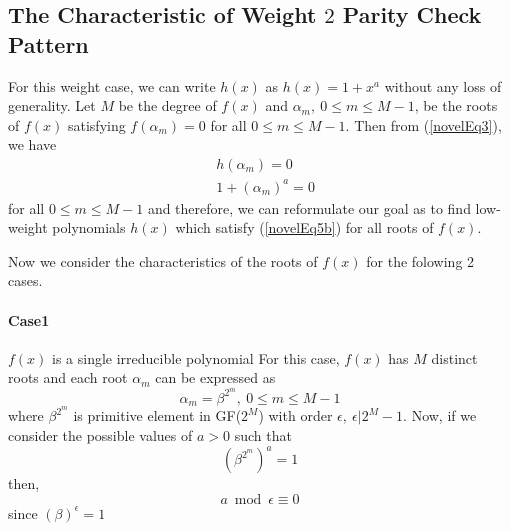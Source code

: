\subsection{The Characteristic of Weight $2$ Parity Check Pattern}
For this weight case, we can write $h(x)$ as $h(x)=1+x^a$ without any loss of generality. 
Let $M$ be the degree of $f(x)$ and $\alpha_m, ~0 \leq m \leq M-1$, be the roots of $f(x)$ satisfying $f(\alpha_m) = 0$ for all $0 \leq m \leq M-1$. Then from (\ref{novelEq3}), we have
\begin{equation}
\begin{split}
&h(\alpha_m)=0\\
&1+(\alpha_m)^a =0
\end{split}
\label{novelEq5b}
\end{equation}
for all $0 \leq m \leq M-1$ and therefore, we can reformulate our goal as to find low-weight polynomials $h(x)$ which satisfy (\ref{novelEq5b}) for all roots of $f(x)$. 

Now we consider the characteristics of the roots of $f(x)$ for the folowing 2 cases.
\paragraph{ Case1} $f(x)$ is a single irreducible polynomial\newline
For this case, $f(x)$ has $M$ distinct roots and each root $\alpha_m$ can be expressed as
\begin{equation}
\alpha_m=\beta^{2^m},~ 0\leq m \leq M-1
\end{equation}
where $\beta^{2^m}$ is primitive element in GF($2^M$) with order $\epsilon,~\epsilon | 2^M-1$. 
Now, if we consider the possible values of $a>0$ such that 
$$(\beta^{2^m})^a=1$$
then,
$$a \bmod \epsilon  \equiv 0$$
since $(\beta)^{\epsilon}=1$

